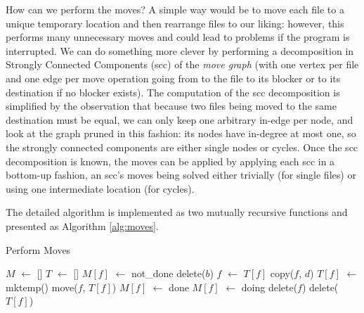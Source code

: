 \documentclass[11pt]{llncs}
\newcommand*\Let[2]{\State #1 $\gets$ #2}
\begin{document}
How can we perform the moves? A simple way would be to move each file to a unique temporary location and then rearrange files to our liking: however, this performs many unnecessary moves and could lead to problems if the program is interrupted. We can do something more clever by performing a decomposition in Strongly Connected Components ({\sc scc}) of the {\sl move graph} (with one vertex per file and one edge per move operation going from to the file to its blocker or to its destination if no blocker exists). The computation of the {\sc scc} decomposition is simplified by the observation that because two files being moved to the same destination must be equal, we can only keep one arbitrary in-edge per node, and look at the graph pruned in this fashion: its nodes have in-degree at most one, so the strongly connected components are either single nodes or cycles. Once the {\sc scc} decomposition is known, the moves can be applied by applying each {\sc scc} in a bottom-up fashion, an {\sc scc}'s moves being solved either trivially (for single files) or using one intermediate location (for cycles).

The detailed algorithm is implemented as two mutually recursive functions and presented as Algorithm \ref{alg:moves}.

\begin{algorithm}
  \caption{Perform Moves}
  \label{alg:moves}
  \begin{algorithmic}[1]
    \Statex
    \Let{$M$}{[]}
    \Let{$T$}{[]}
      \Let{$M[f]$}{not\_done}
    \EndFor
          \State delete($b$) 
        \Else
          \State {} 
        \EndIf
      \EndIf
        \Let{$f$}{$T[f]$}
      \EndIf
      \State copy($f$, $d$)
    \EndFunction
        \State \Return {}
      \EndIf
        \Let{$T[f]$}{mktemp()}
        \State move($f$, $T[f]$)
        \Let{$M[f]$}{done}
        \State \Return {}
      \EndIf
      \Let{$M[f]$}{doing}
          \State {} 
        \EndIf
      \EndFor
        \State delete($f$)
      \EndIf
        \State delete($T[f]$)
      \EndIf
    \EndFunction

      \State {}
    \EndFor
  \end{algorithmic}
\end{algorithm}
\end{document}
